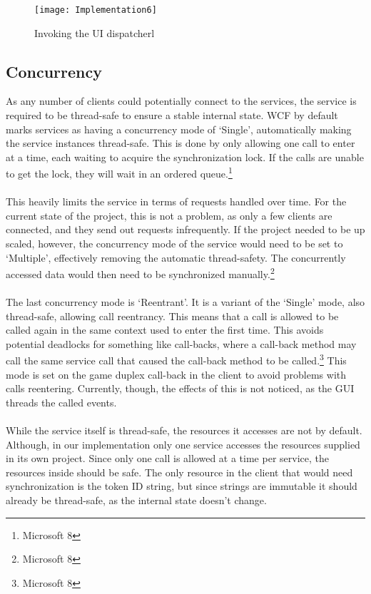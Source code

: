 \begin{figure}[h]
\centerline{\texttt{[image: Implementation6]}}
\caption {Invoking the UI dispatcherl}
\label {fig:implementation6}
\end{figure}

\subsection {Concurrency}
As any number of clients could potentially connect to the services, the
service is required to be thread-safe to ensure a stable internal state.
WCF by default marks services as having a concurrency mode of ‘Single’,
 automatically making the service instances thread-safe. This is done by
  only allowing one call to enter at a time, each waiting to acquire the
  synchronization lock. If the calls are unable to get the lock, they will
   wait in an ordered queue.\footnote{Microsoft 8}
\\\\
This heavily limits the service in terms of requests handled over time. For
 the current state of the project, this is not a problem, as only a few
  clients are connected, and they send out requests infrequently. If the
  project needed to be up scaled, however, the concurrency mode of the
  service would need to be set to ‘Multiple’, effectively removing the
  automatic thread-safety. The concurrently accessed data would then
   need to be synchronized manually.\footnote{Microsoft 8}
\\\\
The last concurrency mode is ‘Reentrant’. It is a variant of the ‘Single’
 mode, also thread-safe, allowing call reentrancy. This means that a call
 is allowed to be called again in the same context used to enter the first
 time. This avoids potential deadlocks for something like call-backs, where
  a call-back method may call the same service call that caused the call-back
   method to be called.\footnote{Microsoft 8} This mode is set on the game
   duplex call-back in the client to avoid problems with calls reentering.
   Currently, though, the effects of this is not noticed, as the GUI threads
    the called events.
\\\\
While the service itself is thread-safe, the resources it accesses are not by
 default. Although, in our implementation only one service accesses the
 resources supplied in its own project. Since only one call is allowed at a
  time per service, the resources inside should be safe. The only resource
  in the client that would need synchronization is the token ID string, but
   since strings are immutable it should already be thread-safe, as the
    internal state doesn’t change.

